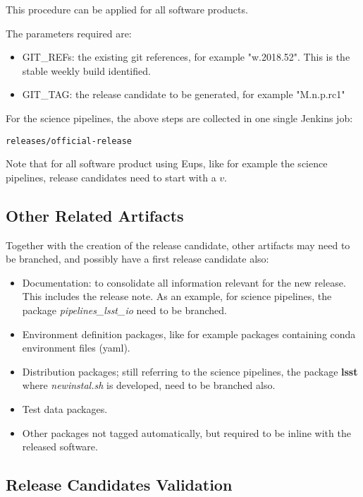 This procedure can be applied for all software products.

The parameters required are:
\begin{itemize}
\item GIT\_REFs: the existing git references, for example "w.2018.52". This is the stable weekly build identified.
\item GIT\_TAG: the release candidate to be generated, for example "M.n.p.rc1"
\end{itemize}

For the science pipelines, the above steps are collected in one single Jenkins job:
 
\begin{verbatim}
releases/official-release
\end{verbatim}

Note that for all software product using Eups, like for example the science pipelines, release candidates need to start with a $v$.

\subsection{Other Related Artifacts}

Together with the creation of the release candidate, other artifacts may need to be branched, and possibly have a first release candidate also:

\begin{itemize}
\item Documentation: to consolidate all information relevant for the new release. This includes the release note. 
As an example, for science pipelines, the package \textit{pipelines\_lsst\_io} need to be branched.
\item  Environment definition packages, like for example packages containing conda environment files (yaml).
\item  Distribution packages; still referring to the science pipelines, the package {\bf lsst}  where \textit{newinstal.sh} is developed, need to be branched also.
\item Test data packages.
\item Other packages not tagged automatically, but required to be inline with the released software.
\end{itemize}


\subsection{Release Candidates Validation} \label{sec:rcvalidation}

